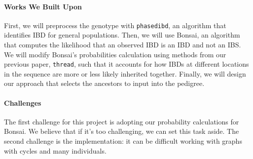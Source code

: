 \documentclass[12pt]{article}
\begin{document}
\paragraph*{Works We Built Upon}

First, we will preprocess the genotype with \texttt{phasedibd}, an algorithm that identifies IBD for general populations\cite{Freyman2021}. 
Then, we will use Bonsai, an algorithm that computes the likelihood that an observed IBD is an IBD and not an IBS. We will modify Bonsai's probabilities calculation using methods from our previous paper, \texttt{thread}, such that it accounts for how IBDs at different locations in the sequence are more or less likely inherited together\cite{Finke2021}. Finally, we will design our approach that selects the ancestors to input into the pedigree.

\paragraph*{Challenges} The first challenge for this project is adopting our probability calculations for Bonsai. We believe that if it's too challenging, we can set this task aside. The second challenge is the implementation: it can be difficult working with graphs with cycles and many individuals.

\printbibliography
\end{document}
